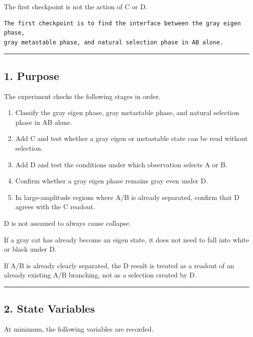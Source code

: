 \documentclass{article}
\providecommand{\tightlist}{\setlength{\itemsep}{0pt}\setlength{\parskip}{0pt}}
\begin{document}
The first checkpoint is not the action of C or D.

\begin{verbatim}
The first checkpoint is to find the interface between the gray eigen phase,
gray metastable phase, and natural selection phase in AB alone.
\end{verbatim}

\begin{center}\rule{0.5\linewidth}{0.5pt}\end{center}

\subsection{1. Purpose}\label{purpose}

The experiment checks the following stages in order.

\begin{enumerate}
\def\labelenumi{\arabic{enumi}.}
\tightlist
\item
  Classify the gray eigen phase, gray metastable phase, and natural
  selection phase in AB alone.
\item
  Add C and test whether a gray eigen or metastable state can be read
  without selection.
\item
  Add D and test the conditions under which observation selects A or B.
\item
  Confirm whether a gray eigen phase remains gray even under D.
\item
  In large-amplitude regions where A/B is already separated, confirm
  that D agrees with the C readout.
\end{enumerate}

D is not assumed to always cause collapse.

If a gray cat has already become an eigen state, it does not need to
fall into white or black under D.

If A/B is already clearly separated, the D result is treated as a
readout of an already existing A/B branching, not as a selection created
by D.

\begin{center}\rule{0.5\linewidth}{0.5pt}\end{center}

\subsection{2. State Variables}\label{state-variables}

At minimum, the following variables are recorded.
\end{document}
